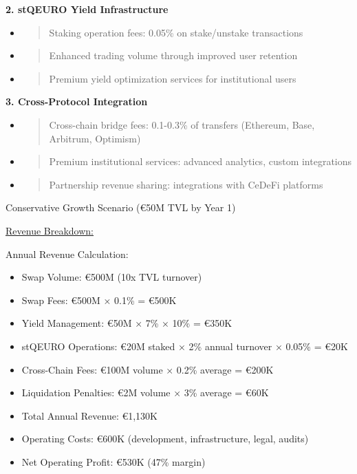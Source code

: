 \textbf{2. stQEURO Yield Infrastructure}

\begin{itemize}
\item
  \begin{quote}
  Staking operation fees: 0.05\% on stake/unstake transactions
  \end{quote}
\item
  \begin{quote}
  Enhanced trading volume through improved user retention
  \end{quote}
\item
  \begin{quote}
  Premium yield optimization services for institutional users
  \end{quote}
\end{itemize}

\textbf{3. Cross-Protocol Integration}

\begin{itemize}
\item
  \begin{quote}
  Cross-chain bridge fees: 0.1-0.3\% of transfers (Ethereum, Base,
  Arbitrum, Optimism)
  \end{quote}
\item
  \begin{quote}
  Premium institutional services: advanced analytics, custom
  integrations
  \end{quote}
\item
  \begin{quote}
  Partnership revenue sharing: integrations with CeDeFi platforms
  \end{quote}
\end{itemize}

Conservative Growth Scenario (€50M TVL by Year 1)

\ul{Revenue Breakdown:}

Annual Revenue Calculation:

\begin{itemize}
\item
  Swap Volume: €500M (10x TVL turnover)
\item
  Swap Fees: €500M × 0.1\% = €500K
\item
  Yield Management: €50M × 7\% × 10\% = €350K
\item
  stQEURO Operations: €20M staked × 2\% annual turnover × 0.05\% = €20K
\item
  Cross-Chain Fees: €100M volume × 0.2\% average = €200K
\item
  Liquidation Penalties: €2M volume × 3\% average = €60K
\item
  Total Annual Revenue: €1,130K
\item
  Operating Costs: €600K (development, infrastructure, legal, audits)
\item
  Net Operating Profit: €530K (47\% margin)
\end{itemize}

